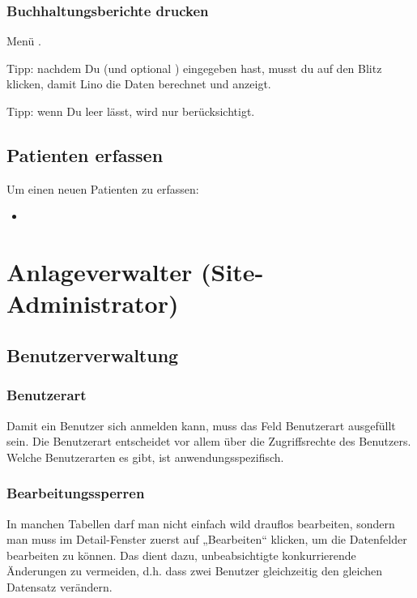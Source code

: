 \documentclass[letterpaper,10pt,ngerman]{sphinxmanual}
\begin{document}
\subsection{Buchhaltungsberichte drucken}
\label{\detokenize{sek/ledger:buchhaltungsberichte-drucken}}
Menü .

Tipp: nachdem Du  (und optional ) eingegeben
hast, musst du auf den Blitz klicken, damit Lino die Daten berechnet
und anzeigt.

Tipp: wenn Du  leer lässt, wird nur 
berücksichtigt.


\section{Patienten erfassen}
\label{\detokenize{sek/index:patienten-erfassen}}
Um einen neuen Patienten zu erfassen:
\begin{itemize}
\item {} 

\end{itemize}


\chapter{Anlageverwalter (Site-Administrator)}
\label{\detokenize{adm/index:anlageverwalter-site-administrator}}\label{\detokenize{adm/index::doc}}

\section{Benutzerverwaltung}
\label{\detokenize{adm/users:benutzerverwaltung}}\label{\detokenize{adm/users::doc}}

\subsection{Benutzerart}
\label{\detokenize{adm/users:benutzerart}}
Damit ein Benutzer sich anmelden kann, muss das Feld Benutzerart
ausgefüllt sein. Die Benutzerart entscheidet vor allem über die
Zugriffsrechte des Benutzers. Welche Benutzerarten es gibt, ist
anwendungsspezifisch.


\subsection{Bearbeitungssperren}
\label{\detokenize{adm/users:bearbeitungssperren}}
In manchen Tabellen darf man nicht einfach wild drauflos bearbeiten,
sondern man muss im Detail-Fenster zuerst auf „Bearbeiten“ klicken, um
die Datenfelder bearbeiten zu können. Das dient dazu, unbeabsichtigte
konkurrierende Änderungen zu vermeiden, d.h. dass zwei Benutzer
gleichzeitig den gleichen Datensatz verändern.
\end{document}
